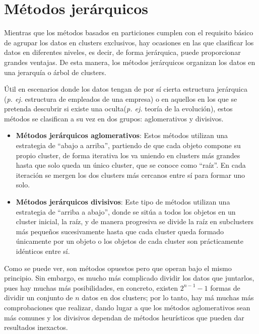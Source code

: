 \documentclass[10pt, a4paper]{article}
\begin{document}

\section{Métodos jerárquicos} \label{sec:Métodos jerárquicos}

\cite{LIBRO} Mientras que los métodos basados en particiones cumplen con el requisito básico de agrupar los datos en clusters exclusivos, hay ocasiones en las que clasificar los datos en diferentes niveles, es decir, de forma jerárquica, puede proporcionar grandes ventajas. De esta manera, los métodos jerárquicos organizan los datos en una jerarquía o árbol de clusters. 

Útil en escenarios donde los datos tengan de por sí cierta estructura jerárquica (\textit{p. ej.} estructura de empleados de una empresa) o en aquellos en los que se pretenda descubrir si existe una oculta(\textit{p. ej.} teoría de la evolución), estos métodos se clasifican a su vez en dos grupos: aglomerativos y divisivos. 

\begin{itemize}
  \item \textbf{Métodos jerárquicos aglomerativos}: Estos métodos utilizan una estrategia de ``abajo a arriba'', partiendo de que cada objeto compone su propio cluster, de forma iterativa los va uniendo en clusters más grandes hasta que solo queda un único cluster, que se conoce como ``raíz''. En cada iteración se mergen los dos clusters más cercanos entre sí para formar uno solo.

  \item \textbf{Métodos jerárquicos divisivos}: Este tipo de métodos utilizan una estrategia de ``arriba a abajo'', donde se sitúa a todos los objetos en un cluster inicial, la raíz, y de manera progresiva se divide la raíz en subclusters más pequeños sucesivamente hasta que cada cluster queda formado únicamente por un objeto o los objetos de cada cluster son prácticamente idénticos entre sí.
\end{itemize}

Como se puede ver, son métodos opuestos pero que operan bajo el mismo principio. Sin embargo, es mucho más complicado dividir los datos que juntarlos, pues hay muchas más posibilidades, en concreto, existen $2^{n-1}-1$ formas de dividir un conjunto de $n$ datos en dos clusters; por lo tanto, hay má muchas más comprobaciones que realizar, dando lugar a que los métodos aglomerativos sean más comunes y los divisivos dependan de métodos heurísticos que pueden dar resultados inexactos.
\end{document}
